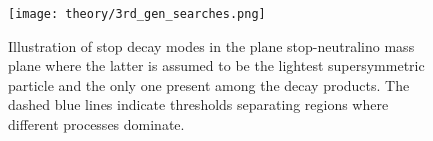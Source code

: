 			\begin{figure}[!htb]
				\centering
				\texttt{[image: theory/3rd\_gen\_searches.png]}
				\caption{\label{fig:stop_topologies} Illustration of stop decay modes in the plane stop-neutralino mass plane where the latter is assumed to be the lightest supersymmetric particle and the only one present among the decay products. The dashed blue lines indicate thresholds separating regions where different processes dominate.}
			\end{figure}


